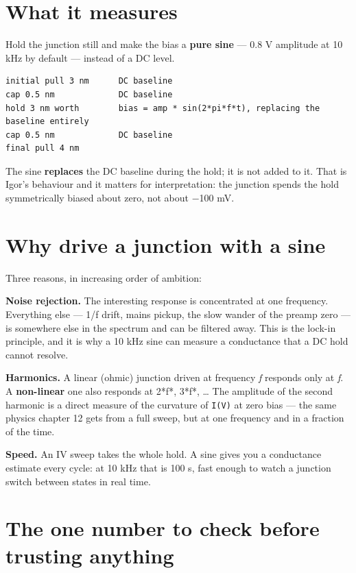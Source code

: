 \section{What it measures}

Hold the junction still and make the bias a \textbf{pure sine} --- 0.8 V amplitude at 10 kHz by default --- instead of a DC level.

\begin{lstlisting}[style=out]
initial pull 3 nm      DC baseline
cap 0.5 nm             DC baseline
hold 3 nm worth        bias = amp * sin(2*pi*f*t), replacing the baseline entirely
cap 0.5 nm             DC baseline
final pull 4 nm
\end{lstlisting}

The sine \textbf{replaces} the DC baseline during the hold; it is not added to it. That is Igor's behaviour and it matters for interpretation: the junction spends the hold symmetrically biased about zero, not about −100 mV.

\section{Why drive a junction with a sine}

Three reasons, in increasing order of ambition:

\textbf{Noise rejection.} The interesting response is concentrated at one frequency. Everything else --- 1/f drift, mains pickup, the slow wander of the preamp zero --- is somewhere else in the spectrum and can be filtered away. This is the lock-in principle, and it is why a 10 kHz sine can measure a conductance that a DC hold cannot resolve.

\textbf{Harmonics.} A linear (ohmic) junction driven at frequency \emph{f} responds only at \emph{f}. A \textbf{non-linear} one also responds at 2*f*, 3*f*, \ldots{} The amplitude of the second harmonic is a direct measure of the curvature of \texttt{I(V)} at zero bias --- the same physics chapter 12 gets from a full sweep, but at one frequency and in a fraction of the time.

\textbf{Speed.} An IV sweep takes the whole hold. A sine gives you a conductance estimate every cycle: at 10 kHz that is 100 \textmu{}s, fast enough to watch a junction switch between states in real time.

\section{The one number to check before trusting anything}

